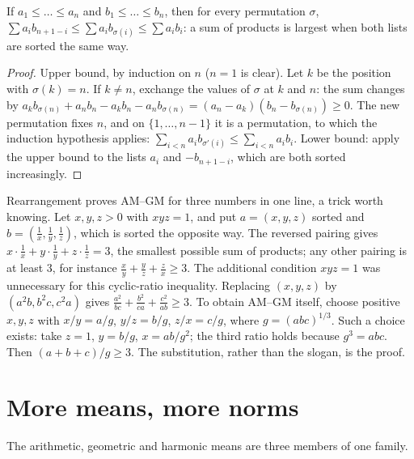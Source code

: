 \begin{proposition}[rearrangement]\label{prop:rearr}
If $a_1\le\dots\le a_n$ and $b_1\le\dots\le b_n$, then for every permutation $\sigma$,
$\sum a_ib_{n+1-i}\le\sum a_ib_{\sigma(i)}\le\sum a_ib_i$: a sum of products is largest when both lists are sorted the same way.
\end{proposition}
\begin{proof}
Upper bound, by induction on $n$ ($n=1$ is clear). Let $k$ be the position with $\sigma(k)=n$. If $k\ne n$, exchange the values of $\sigma$ at $k$ and $n$: the sum changes by
$a_kb_{\sigma(n)}+a_nb_n-a_kb_n-a_nb_{\sigma(n)}=(a_n-a_k)(b_n-b_{\sigma(n)})\ge0$. The new permutation fixes $n$, and on $\{1,\dots,n-1\}$ it is a permutation, to which the induction hypothesis applies: $\sum_{i<n}a_ib_{\sigma'(i)}\le\sum_{i<n}a_ib_i$.
Lower bound: apply the upper bound to the lists $a_i$ and $-b_{n+1-i}$, which are both sorted increasingly.
\end{proof}

\begin{examplex}
Rearrangement proves AM--GM for three numbers in one line, a trick worth knowing. Let $x,y,z>0$ with $xyz=1$, and put $a=(x,y,z)$ sorted and
$b=(\frac1x,\frac1y,\frac1z)$, which is sorted the opposite way. The reversed pairing gives $x\cdot\frac1x+y\cdot\frac1y+z\cdot\frac1z=3$, the smallest
possible sum of products; any other pairing is at least $3$, for instance $\frac xy+\frac yz+\frac zx\ge3$. The additional condition $xyz=1$ was unnecessary for this cyclic-ratio inequality. Replacing $(x,y,z)$ by
$(a^2b,b^2c,c^2a)$ gives $\frac{a^2}{bc}+\frac{b^2}{ca}+\frac{c^2}{ab}\ge3$. To obtain AM--GM itself, choose positive $x,y,z$ with $x/y=a/g$, $y/z=b/g$, $z/x=c/g$, where $g=(abc)^{1/3}$. Such a choice exists: take $z=1$, $y=b/g$, $x=ab/g^2$; the third ratio holds because $g^3=abc$. Then $(a+b+c)/g\ge3$. The substitution, rather than the slogan, is the proof.
\end{examplex}

\section{More means, more norms}

The arithmetic, geometric and harmonic means are three members of one family.

